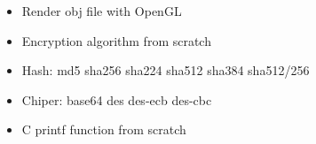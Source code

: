 

\begin{itemize}
    \item Render obj file with OpenGL
\end{itemize}

\begin{itemize}
    \item Encryption algorithm from scratch
    \item Hash: md5 sha256 sha224 sha512 sha384 sha512/256
    \item Chiper: base64 des des-ecb des-cbc
\end{itemize}
\begin{itemize}
    \item C printf function from scratch
\end{itemize}

